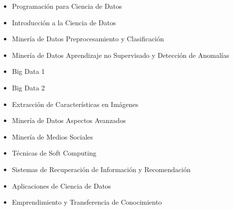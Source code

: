 

\begin{itemize}
\item Programación para Ciencia de Datos
\item Introducción a la Ciencia de Datos
\item Minería de Datos Preprocesamiento y Clasificación
\item Minería de Datos Aprendizaje no Supervisado y Detección de Anomalías
\item Big Data 1
\item Big Data 2
\item Extracción de Características en Imágenes
\item Minería de Datos Aspectos Avanzados
\item Minería de Medios Sociales
\item Técnicas de Soft Computing
\item Sistemas de Recuperación de Información y Recomendación
\item Aplicaciones de Ciencia de Datos
\item Emprendimiento y Transferencia de Conocimiento
\end{itemize}


\divider





 













\clearpage

